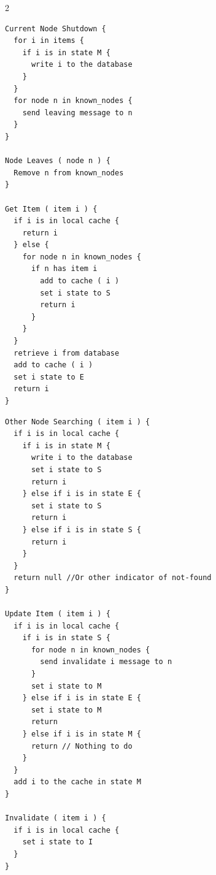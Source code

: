 \begin{multicols}{2}
\begin{lstlisting}
Current Node Shutdown { 
  for i in items {
    if i is in state M {
      write i to the database
    }
  }
  for node n in known_nodes {
    send leaving message to n
  }
}

Node Leaves ( node n ) {
  Remove n from known_nodes
}

Get Item ( item i ) {
  if i is in local cache {
    return i
  } else {
    for node n in known_nodes {
      if n has item i
        add to cache ( i )
        set i state to S
        return i
      }
    }
  }
  retrieve i from database
  add to cache ( i )
  set i state to E
  return i
}
\end{lstlisting}
\columnbreak

\begin{lstlisting}
Other Node Searching ( item i ) {
  if i is in local cache {
    if i is in state M {
      write i to the database
      set i state to S
      return i
    } else if i is in state E {
      set i state to S
      return i
    } else if i is in state S {
      return i    
	}
  } 
  return null //Or other indicator of not-found
}

Update Item ( item i ) {
  if i is in local cache {
    if i is in state S {
      for node n in known_nodes {
        send invalidate i message to n
      }
      set i state to M
    } else if i is in state E {
      set i state to M
      return
    } else if i is in state M {
      return // Nothing to do
    }
  }
  add i to the cache in state M
}

Invalidate ( item i ) {
  if i is in local cache {
    set i state to I
  }
}
\end{lstlisting}
\end{multicols}





